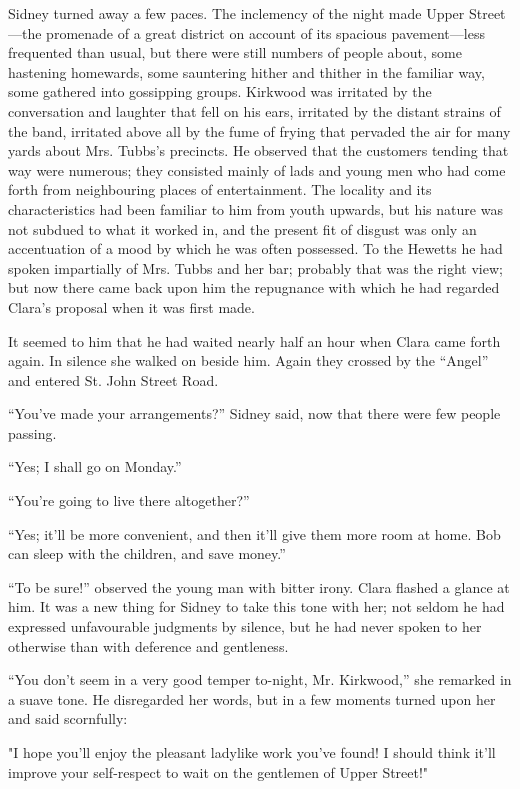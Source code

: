 Sidney turned away a few paces. The inclemency of the night made Upper
Street---the promenade of a great district on account of its spacious
pavement---less frequented than usual, but there were still numbers of
people about, some hastening homewards, some sauntering hither and
thither in the familiar way, some gathered into gossipping groups.
Kirkwood was irritated by the {\protect\hypertarget{74}{}{}}conversation
and laughter that fell on his ears, irritated by the distant strains of
the band, irritated above all by the fume of frying that pervaded the
air for many yards about Mrs. Tubbs's precincts. He observed that the
customers tending that way were numerous; they consisted mainly of lads
and young men who had come forth from neighbouring places of
entertainment. The locality and its characteristics had been familiar to
him from youth upwards, but his nature was not subdued to what it worked
in, and the present fit of disgust was only an accentuation of a mood by
which he was often possessed. To the Hewetts he had spoken impartially
of Mrs. Tubbs and her bar; probably that was the right view; but now
there came back upon him the repugnance with which he had regarded
Clara's proposal when it was first made.

It seemed to him that he had waited nearly half an hour when Clara came
forth again. In silence she walked on beside him. Again they crossed by
the ``Angel'' and entered St. John Street Road.

{\protect\hypertarget{75}{}{}}``You've made your arrangements?'' Sidney
said, now that there were few people passing.

``Yes; I shall go on Monday.''

``You're going to live there altogether?''

``Yes; it'll be more convenient, and then it'll give them more room at
home. Bob can sleep with the children, and save money.''

``To be sure!'' observed the young man with bitter irony. Clara flashed
a glance at him. It was a new thing for Sidney to take this tone with
her; not seldom he had expressed unfavourable judgments by silence, but
he had never spoken to her otherwise than with deference and gentleness.

``You don't seem in a very good temper to-night, Mr. Kirkwood,'' she
remarked in a suave tone. He disregarded her words, but in a few moments
turned upon her and said scornfully:

"I hope you'll enjoy the pleasant ladylike work you've found! I should
think it'll {\protect\hypertarget{76}{}{}}improve your self-respect to
wait on the gentlemen of Upper Street!"

